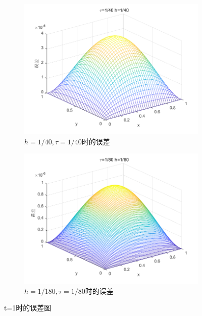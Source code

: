 \documentclass[withoutpreface,bwprint]{cumcmthesis} %
\begin{document}
\begin{figure}
	\begin{subfigure}[b]{0.475\textwidth}   
		\centering 
		\includegraphics[width=\textwidth]{figures/f4}
		\caption[]%
		{{\small $h=1/40,\tau=1/40$时的误差}}    
		\label{fig:mean and std of net34}
	\end{subfigure}
	\quad
	\begin{subfigure}[b]{0.475\textwidth}   
		\centering 
		\includegraphics[width=\textwidth]{figures/f5}
		\caption[]%
		{{\small $h=1/180,\tau=1/80$时的误差}}    
		\label{fig:mean and std of net44}
	\end{subfigure}
	\caption[ The average and standard deviation of critical parameters ]
	{t=1时的误差图} 
	\label{fig:2}
\end{figure}
	
\end{document}
